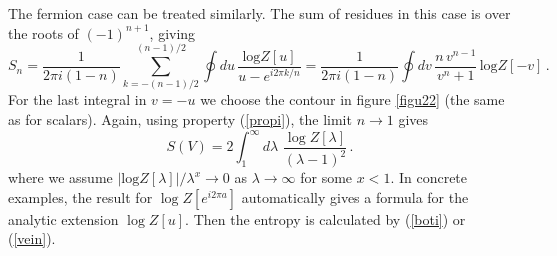 \documentclass[a4paper]{article}
\begin{document}
The fermion case can be treated similarly. The sum of residues in this case is over the roots of $(-1)^{n+1}$, giving
 \begin{equation}
S_n=\frac{1}{2\pi i (1-n)}\sum_{k=-(n-1)/2}^{(n-1)/2}\oint du \, \frac{\textrm{log}Z[u]}{u-e^{i 2 \pi k/n}}=\frac{1}{2\pi i (1-n)}\oint dv \,\frac{n\, v^{n-1}}{v^n+1}\,\textrm{log}Z[-v]\,.\label{chuta2}
\end{equation}
For the last integral in $v=-u$ we choose the contour in figure \ref{figu22} (the same as for scalars). Again, using property (\ref{propi}), the limit $n\rightarrow 1$ gives     
\begin{equation}
S(V)=2\int_1^{\infty}d\lambda\,\, \frac{\log Z[\lambda]}{(\lambda-1)^2}\,.\label{vein}
\end{equation}
where we assume $\left|\textrm{log} Z[\lambda]\right|/\lambda^x\rightarrow 0$ as $\lambda\rightarrow\infty$ for some $x<1$. 
In concrete examples, the result for $\log Z[e^{i 2 \pi a}]$ automatically gives a formula for the analytic extension $\log Z[u]$. Then the entropy is calculated by (\ref{boti}) or (\ref{vein}). 
\end{document}
